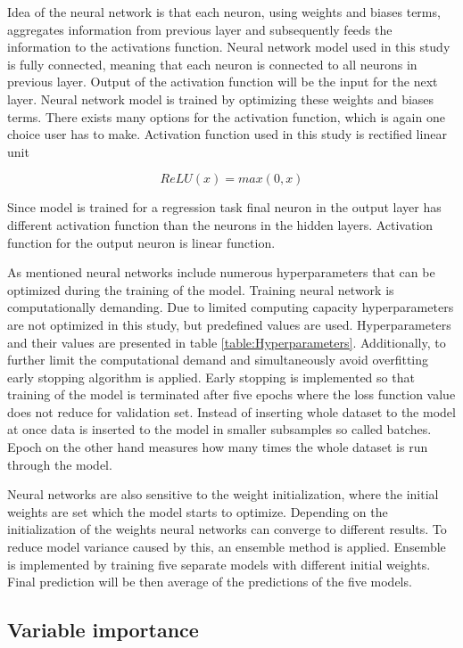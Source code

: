 \documentclass{article}
\begin{document}
Idea of the neural network is that each neuron, using weights and biases terms, aggregates information from previous layer and subsequently feeds the information to the activations function. Neural network model used in this study is fully connected, meaning that each neuron is connected to all neurons in previous layer. Output of the activation function will be the input for the next layer. Neural network model is trained by optimizing these weights and biases terms. There exists many options for the activation function, which is again one choice user has to make. Activation function used in this study is rectified linear unit

\begin{equation}
\label{ReLU}
ReLU(x) = max(0, x)
\end{equation}

Since model is trained for a regression task final neuron in the output layer has different activation function than the neurons in the hidden layers. Activation function for the output neuron is linear function. 

As mentioned neural networks include numerous hyperparameters that can be optimized during the training of the model. Training neural network is computationally demanding. Due to limited computing capacity hyperparameters are not optimized in this study, but predefined values are used. Hyperparameters and their values are presented in table \ref{table:Hyperparameters}. Additionally, to further limit the computational demand and simultaneously avoid overfitting early stopping algorithm is applied. Early stopping is implemented so that training of the model is terminated after five epochs where the loss function value does not reduce for validation set. Instead of inserting whole dataset to the model at once data is inserted to the model in smaller subsamples so called batches. Epoch on the other hand measures how many times the whole dataset is run through the model. 

Neural networks are also sensitive to the weight initialization, where the initial weights are set which the model starts to optimize. Depending on the initialization of the weights neural networks can converge to different results. To reduce model variance caused by this, an ensemble method is applied. Ensemble is implemented by training five separate models with different initial weights. Final prediction will be then average of the predictions of the five models.

\subsection{Variable importance} \label{VariableImportance}
\end{document}
